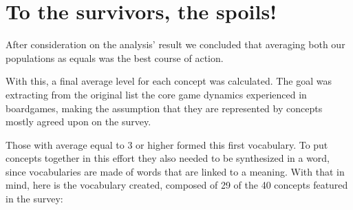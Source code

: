 \section{To the survivors, the spoils!}

After consideration on the analysis' result we concluded that averaging both our populations as equals was the best course of action.

With this, a final average level for each concept was calculated. The goal was  extracting from the original list the core game dynamics experienced in boardgames, making the assumption that they are represented by concepts mostly agreed upon on the survey. 

Those with average equal to 3 or higher formed this first vocabulary. To put concepts together in this effort they also needed to be synthesized in a word, since vocabularies are made of words that are linked to a meaning. With that in mind, here is the vocabulary created, composed of 29 of the 40 concepts featured in the survey:

